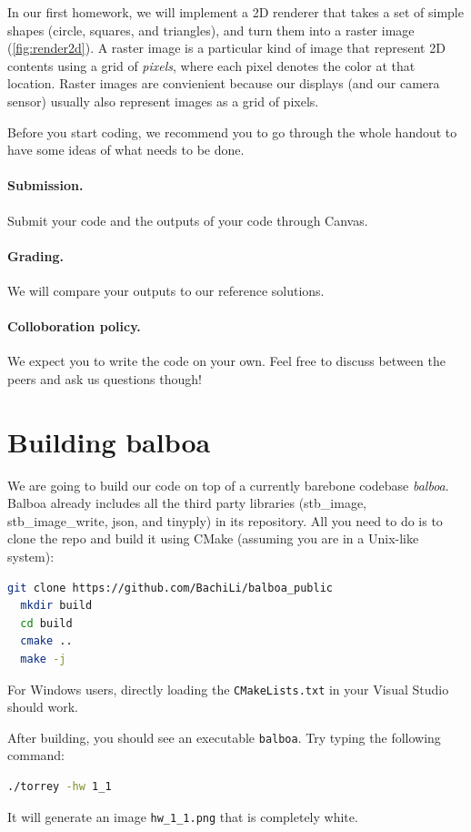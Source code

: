 In our first homework, we will implement a 2D renderer that takes a set of simple shapes (circle, squares, and triangles), and turn them into a raster image (\cref{fig:render2d}). A raster image is a particular kind of image that represent 2D contents using a grid of \emph{pixels}, where each pixel denotes the color at that location. Raster images are convienient because our displays (and our camera sensor) usually also represent images as a grid of pixels.

Before you start coding, we recommend you to go through the whole handout to have some ideas of what needs to be done.

\paragraph{Submission.} Submit your code and the outputs of your code through Canvas.

\paragraph{Grading.} We will compare your outputs to our reference solutions.

\paragraph{Colloboration policy.} We expect you to write the code on your own. Feel free to discuss between the peers and ask us questions though!

\section{Building balboa}

We are going to build our code on top of a currently barebone codebase \emph{balboa}. Balboa already includes all the third party libraries (stb\_image, stb\_image\_write, json, and tinyply) in its repository.
All you need to do is to clone the repo and build it using CMake (assuming you are in a Unix-like system):
\begin{lstlisting}[language=bash]
  git clone https://github.com/BachiLi/balboa_public
  mkdir build
  cd build
  cmake ..
  make -j
\end{lstlisting}
For Windows users, directly loading the \lstinline{CMakeLists.txt} in your Visual Studio should work.

After building, you should see an executable \lstinline{balboa}. Try typing the following command:
\begin{lstlisting}[language=bash]
  ./torrey -hw 1_1
\end{lstlisting}
It will generate an image \lstinline{hw_1_1.png} that is completely white.

